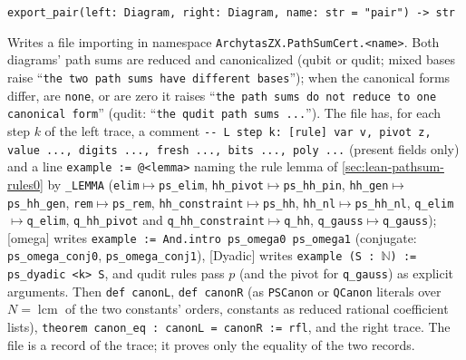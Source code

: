 \begin{signature}
\textnormal{\texttt{export\_\allowbreak{}pair(\allowbreak{}left: Diagram,\allowbreak{} right: Diagram,\allowbreak{} name: str = "pair") -{}> str}}
\end{signature}
\noindent Writes a file importing  in namespace
\textnormal{\texttt{ArchytasZX.\allowbreak{}PathSumCert.\allowbreak{}<name>}}. Both diagrams' path sums are reduced and canonicalized
(qubit or qudit; mixed bases raise ``\texttt{the two path sums have different bases}''); when the
canonical forms differ, are \textnormal{\texttt{none}}, or are zero it raises ``\texttt{the path sums do not reduce
to one canonical form}'' (qudit: ``\texttt{the qudit path sums ...}''). The file has, for each step
$k$ of the left trace, a comment \textnormal{\texttt{-{}-{} L step k: [rule] var v,\allowbreak{} pivot z,\allowbreak{} value .\allowbreak{}.\allowbreak{}.\allowbreak{},\allowbreak{} digits .\allowbreak{}.\allowbreak{}.\allowbreak{},\allowbreak{} fresh .\allowbreak{}.\allowbreak{}.\allowbreak{},\allowbreak{} bits .\allowbreak{}.\allowbreak{}.\allowbreak{},\allowbreak{} poly .\allowbreak{}.\allowbreak{}.\allowbreak{}}}
(present fields only) and a line \textnormal{\texttt{example := @<lemma>}} naming the rule lemma of
\cref{sec:lean-pathsum-rules0} by \textnormal{\texttt{\_\allowbreak{}LEMMA}} (\textnormal{\texttt{elim}}$\mapsto$\textnormal{\texttt{ps\_\allowbreak{}elim}},
\textnormal{\texttt{hh\_\allowbreak{}pivot}}$\mapsto$\textnormal{\texttt{ps\_\allowbreak{}hh\_\allowbreak{}pin}}, \textnormal{\texttt{hh\_\allowbreak{}gen}}$\mapsto$\textnormal{\texttt{ps\_\allowbreak{}hh\_\allowbreak{}gen}}, \textnormal{\texttt{rem}}$\mapsto$\textnormal{\texttt{ps\_\allowbreak{}rem}},
\textnormal{\texttt{hh\_\allowbreak{}constraint}}$\mapsto$\textnormal{\texttt{ps\_\allowbreak{}hh}}, \textnormal{\texttt{hh\_\allowbreak{}nl}}$\mapsto$\textnormal{\texttt{ps\_\allowbreak{}hh\_\allowbreak{}nl}},
\textnormal{\texttt{q\_\allowbreak{}elim}}$\mapsto$\textnormal{\texttt{q\_\allowbreak{}elim}}, \textnormal{\texttt{q\_\allowbreak{}hh\_\allowbreak{}pivot}} and \textnormal{\texttt{q\_\allowbreak{}hh\_\allowbreak{}constraint}}$\mapsto$\textnormal{\texttt{q\_\allowbreak{}hh}},
\textnormal{\texttt{q\_\allowbreak{}gauss}}$\mapsto$\textnormal{\texttt{q\_\allowbreak{}gauss}}); [omega] writes \textnormal{\texttt{example := And.\allowbreak{}intro ps\_\allowbreak{}omega0 ps\_\allowbreak{}omega1}}
(conjugate: \textnormal{\texttt{ps\_\allowbreak{}omega\_\allowbreak{}conj0}}, \textnormal{\texttt{ps\_\allowbreak{}omega\_\allowbreak{}conj1}}), [Dyadic] writes
\textnormal{\texttt{example (\allowbreak{}S : \ensuremath{\mathbb{N}}) := ps\_\allowbreak{}dyadic <k> S}}, and qudit rules pass $p$ (and the pivot for
\textnormal{\texttt{q\_\allowbreak{}gauss}}) as explicit arguments. Then \textnormal{\texttt{def canonL}}, \textnormal{\texttt{def canonR}} (as
\textnormal{\texttt{PSCanon}} or \textnormal{\texttt{QCanon}} literals over $N = \operatorname{lcm}$ of the two constants'
orders, constants as reduced rational coefficient lists), \textnormal{\texttt{theorem canon\_\allowbreak{}eq : canonL = canonR := rfl}},
and the right trace. The file is a record of the trace; it proves only the equality of the two
records.

